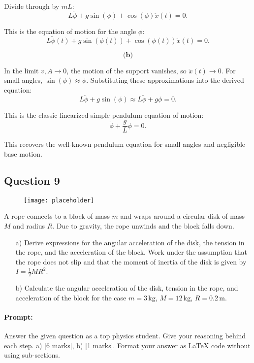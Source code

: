 \documentclass{article}
\begin{document}
Divide through by \(mL\):
\[
L\ddot{\phi} + g\sin(\phi) + \cos(\phi)\ddot{x}(t) = 0.
\]

This is the equation of motion for the angle \(\phi\):
\[
\boxed{L\ddot{\phi}(t) + g\sin(\phi(t)) + \cos(\phi(t))\ddot{x}(t) = 0.}
\]

\[
\textbf{(b)}
\]

In the limit \(v, A \to 0\), the motion of the support vanishes, so \(\ddot{x}(t) \to 0\). For small angles, \(\sin(\phi) \approx \phi\). Substituting these approximations into the derived equation:
\[
L\ddot{\phi} + g\sin(\phi) \approx L\ddot{\phi} + g\phi = 0.
\]

This is the classic linearized simple pendulum equation of motion:
\[
\boxed{\ddot{\phi} + \frac{g}{L}\phi = 0.}
\]

This recovers the well-known pendulum equation for small angles and negligible base motion.


\subsection{Question 9}

\begin{figure}[h!]
    \centering
    \texttt{[image: placeholder]}
    \caption*{}
\end{figure}

A rope connects to a block of mass $m$ and wraps around a circular disk of mass $M$ and radius $R$. Due to gravity, the rope unwinds and the block falls down.

\begin{itemize}
    \item[a)] Derive expressions for the angular acceleration of the disk, the tension in the rope, and the acceleration of the block. Work under the assumption that the rope does not slip and that the moment of inertia of the disk is given by $I = \frac{1}{2} M R^2$.
    
    \item[b)] Calculate the angular acceleration of the disk, tension in the rope, and acceleration of the block for the case $m = 3\, \text{kg}$, $M = 12\, \text{kg}$, $R = 0.2\, \text{m}$.
\end{itemize}

\paragraph{Prompt: \\} 
Answer the given question as a top physics student. Give your reasoning behind each step. a) [6 marks], b) [1 marks].
Format your answer as LaTeX code without using sub-sections.
\end{document}
